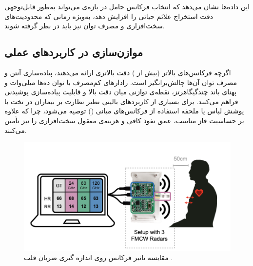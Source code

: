 این داده‌ها نشان می‌دهد که انتخاب فرکانس حامل در بازه‌ی  می‌تواند به‌طور قابل‌توجهی دقت استخراج علائم حیاتی را افزایش دهد، به‌ویژه زمانی که محدودیت‌های سخت‌افزاری و مصرف توان نیز باید در نظر گرفته شوند.

\subsection{موازن‌سازی در کاربردهای عملی}
اگرچه فرکانس‌های بالاتر (بیش از ) دقت بالاتری ارائه می‌دهند، پیاده‌سازی آنتن و مصرف توان آن‌ها چالش‌برانگیز است. رادارهای کم‌مصرف با توان ده‌ها میلی‌وات و پهنای باند چندگیگاهرتز، نقطه‌ی توازنی میان دقت بالا و قابلیت پیاده‌سازی پوشیدنی فراهم می‌کنند. برای بسیاری از کاربردهای بالینی نظیر نظارت بر بیماران در تخت با پوشش لباس یا ملحفه استفاده از فرکانس‌های میانی () توصیه می‌شود، چرا که علاوه بر حساسیت فاز مناسب، عمق نفوذ کافی و هزینه‌ی معقول سخت‌افزاری را نیز تأمین می‌کنند.

\begin{figure}[ht]
    \centering
    \includegraphics[width=0.7\linewidth]{Images/chapter3/3-1.png}
    \caption{ مقایسه تاثیر فرکانس روی اندازه گیری ضربان قلب \cite{marty2024frequency}.}
    \label{fig:fmcw_vitals}
\end{figure}